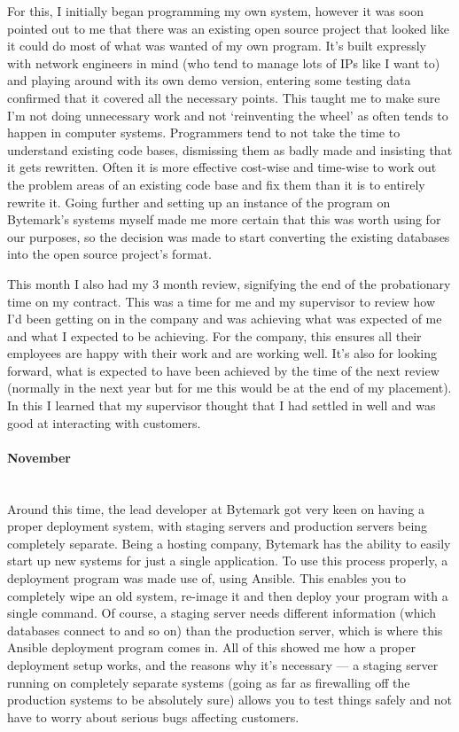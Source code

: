 \documentclass[12pt,a4paper]{article}
\newcommand{\paragraphnl}[1]{\paragraph{#1}\mbox{}\\}
\begin{document}
	For this, I initially began programming my own system, however it was soon
	pointed out to me that there was an existing open source project that
	looked like it could do most of what was wanted of my own program. It's
	built expressly with network engineers in mind (who tend to manage lots of
	IPs like I want to) and playing around with its own demo version, entering
	some testing data confirmed that it covered all the necessary points. This
	taught me to make sure I'm not doing unnecessary work and not `reinventing
	the wheel' as often tends to happen in computer systems. Programmers tend
	to not take the time to understand existing code bases, dismissing them as
	badly made and insisting that it gets rewritten. Often it is more effective
	cost-wise and time-wise to work out the problem areas of an existing code
	base and fix them than it is to entirely rewrite it. Going further and
	setting up an instance of the program on Bytemark's systems myself made me
	more certain that this was worth using for our purposes, so the decision
	was made to start converting the existing databases into the open source
	project's format.

	This month I also had my 3 month review, signifying the end of the
	probationary time on my contract. This was a time for me and my supervisor
	to review how I'd been getting on in the company and was achieving what was
	expected of me and what I expected to be achieving. For the company, this
	ensures all their employees are happy with their work and are working well.
	It's also for looking forward, what is expected to have been achieved by
	the time of the next review (normally in the next year but for me this
	would be at the end of my placement). In this I learned that my supervisor
	thought that I had settled in well and was good at interacting with
	customers.

\paragraphnl{November}
	Around this time, the lead developer at Bytemark got very keen on having a
	proper deployment system, with staging servers and production servers
	being completely separate. Being a hosting company, Bytemark has the
	ability to easily start up new systems for just a single application. To
	use this process properly, a deployment program was made use of, using
	Ansible. This enables you to completely wipe an old system, re-image it and
	then deploy your program with a single command. Of course, a staging server
	needs different information (which databases connect to and so on) than the
	production server, which is where this Ansible deployment program comes in.
	All of this showed me how a proper deployment setup works, and the reasons
	why it's necessary --- a staging server running on completely separate
	systems (going as far as firewalling off the production systems to be
	absolutely sure) allows you to test things safely and not have to worry
	about serious bugs affecting customers.
\end{document}
